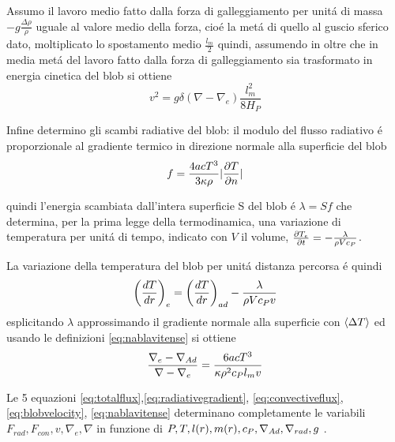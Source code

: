 \documentclass[../main.tex]{subfiles}
\begin{document}
Assumo il lavoro medio fatto dalla forza di galleggiamento per unit\'a di massa $-g\frac{\Delta\rho}{\rho}$ uguale al valore medio della forza, cio\'e la met\'a di quello al guscio sferico dato, moltiplicato lo spostamento medio $\frac{l_m}{2}$ quindi, assumendo in oltre che in media met\'a del lavoro fatto dalla forza di galleggiamento sia trasformato in energia cinetica del blob si ottiene
\begin{equation}
v^2=g\delta(\nabla-\nabla_e)\frac{l_m^2}{8H_P}\label{eq:blobvelocity}
\end{equation}

Infine determino gli scambi radiative del blob: il modulo del flusso radiativo \'e proporzionale al gradiente termico in direzione normale alla superficie del blob
\begin{equation}
f=\frac{4acT^3}{3\kappa\rho}|\PDy{n}{T}|
\end{equation}

quindi l'energia scambiata dall'intera superficie S del blob \'e $\lambda=Sf$ che determina, per la prima legge della termodinamica, una variazione di temperatura per unit\'a di tempo, indicato con $V$ il volume, $\PDy{t}{T_e}=-\frac{\lambda}{\rho Vc_P}$.

La variazione della temperatura del blob per unit\'a distanza percorsa \'e quindi
\begin{equation}
\Dcvar{\TDy{r}{T}}{e}=\Dcvar{\TDy{r}{T}}{ad}-\frac{\lambda}{\rho Vc_Pv}\label{eq:Tchangelength}
\end{equation}
esplicitando $\lambda$ approssimando il gradiente normale alla superficie con $\exv{\Delta T}$ ed usando le definizioni \eqref{eq:nablavitense} si ottiene
\begin{equation}
\frac{\nabla_e-\nad{}}{\nabla-\nabla_e}=\frac{6acT^3}{\kappa\rho^2c_Pl_mv}
\end{equation}

Le 5 equazioni \eqref{eq:totalflux},\eqref{eq:radiativegradient}, \eqref{eq:convectiveflux}, \eqref{eq:blobvelocity}, \eqref{eq:nablavitense} determinano completamente le variabili $F_{rad}, F_{con}, v, \nabla_e, \nabla$ in funzione di $P,T,l(r),m(r),c_P,\nad{},\nrad{},g$ .

\begin{minipage}{\linewidth}
    \label{fluxproportion}
\end{minipage}
\end{document}
